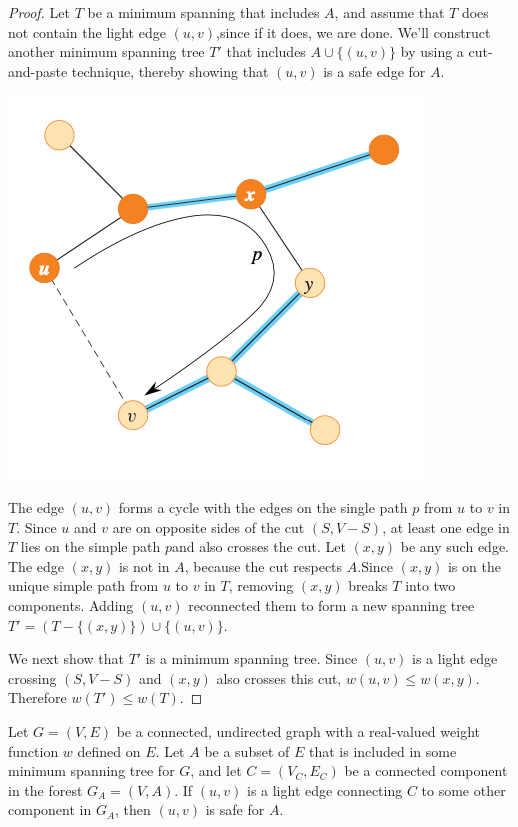 \documentclass[11pt]{article}
\begin{document}
\begin{proof}
Let \(T\) be a minimum spanning that includes \(A\), and assume that \(T\) does not contain the
light edge \((u,v)\),since if it does, we are done. We'll construct another minimum spanning
tree \(T'\) that includes \(A\cup\{(u,v)\}\) by using a cut-and-paste technique, thereby showing
that \((u,v)\) is a safe edge for \(A\).

\begin{center}
\includegraphics[width=.5\textwidth]{../images/clrs/1.png}
\label{}
\end{center}

The edge \((u,v)\) forms a cycle with the edges on the single path \(p\) from \(u\) to \(v\)
in \(T\). Since \(u\) and \(v\) are on opposite sides of the cut \((S,V-S)\), at least one edge
in \(T\) lies on the simple path \(p\)and also crosses the cut. Let \((x,y)\) be any such edge.
The edge \((x,y)\) is not in \(A\), because the cut respects \(A\).Since \((x,y)\) is on the
unique simple path from \(u\) to \(v\) in \(T\), removing \((x,y)\) breaks \(T\) into two
components. Adding \((u,v)\) reconnected them to form a new spanning
tree \(T'=(T-\{(x,y)\})\cup\{(u,v)\}\).

We next show that \(T'\) is a minimum spanning tree. Since \((u,v)\) is a light edge
crossing \((S,V-S)\) and \((x,y)\) also crosses this cut, \(w(u,v)\le w(x,y)\).
Therefore \(w(T')\le w(T)\).
\end{proof}

\begin{corollary}[]
Let \(G=(V,E)\) be a connected, undirected graph with a real-valued weight function \(w\)
defined on \(E\). Let \(A\) be a subset of \(E\) that is included in some minimum spanning tree
for \(G\), and let \(C=(V_C,E_C)\) be a connected component in the forest \(G_A=(V,A)\).
If \((u,v)\) is a light edge connecting \(C\) to some other component in \(G_A\), then \((u,v)\)
is safe for \(A\).
\end{corollary}
\end{document}
